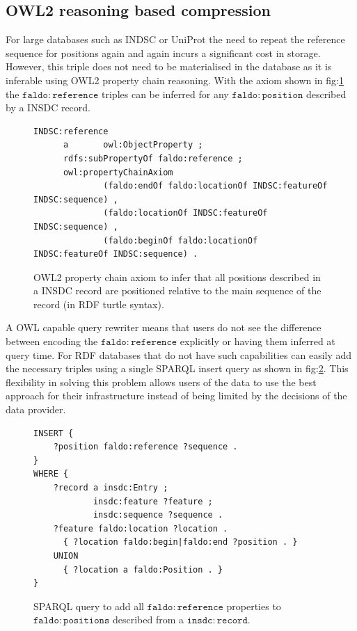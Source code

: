 \subsection*{OWL2 reasoning based compression}
For large databases such as INDSC or UniProt the need to repeat the reference sequence for positions again and again incurs a significant cost in storage. However, this triple does not need to be materialised in the database as it is inferable using OWL2 property chain reasoning.
With the axiom shown in fig:\ref{owl:chainProperty} the $\mathtt{faldo\colon{}reference}$ triples can be inferred for any $\mathtt{faldo\colon{}position}$ described by a INSDC record.
\begin{figure}
\begin{shaded}
\small
\begin{verbatim}
INDSC:reference
      a       owl:ObjectProperty ;
      rdfs:subPropertyOf faldo:reference ;
      owl:propertyChainAxiom
              (faldo:endOf faldo:locationOf INDSC:featureOf INDSC:sequence) , 
              (faldo:locationOf INDSC:featureOf INDSC:sequence) , 
              (faldo:beginOf faldo:locationOf INDSC:featureOf INDSC:sequence) .

\end{verbatim}
\end{shaded}
\caption{OWL2 property chain axiom to infer that all positions described in a INSDC record are positioned relative to the main sequence of the record (in RDF turtle syntax).}
\label{owl:chainProperty}
\end{figure}
A OWL capable query rewriter means that users do not see the difference between encoding the $\mathtt{faldo\colon{}reference}$ explicitly or having them inferred at query time.
For RDF databases that do not have such capabilities can easily add the necessary triples using a single SPARQL insert query as shown in fig:\ref{sparql:chainProperty}. This flexibility in solving this problem allows users of the data to use the best approach for their infrastructure instead of being limited by the decisions of the data provider.
\begin{figure}
\begin{shaded}
\small
\begin{verbatim}
INSERT {
    ?position faldo:reference ?sequence .
}
WHERE {
    ?record a insdc:Entry ;
            insdc:feature ?feature ;
            insdc:sequence ?sequence .
    ?feature faldo:location ?location .
      { ?location faldo:begin|faldo:end ?position . }
    UNION
      { ?location a faldo:Position . }
}
\end{verbatim}
\end{shaded}
\caption{SPARQL query to add all $\mathtt{faldo\colon{}reference}$ properties to $\mathtt{faldo\colon{}positions}$ described from a $\mathtt{insdc\colon{}record}$.}
\label{sparql:chainProperty}
\end{figure}

